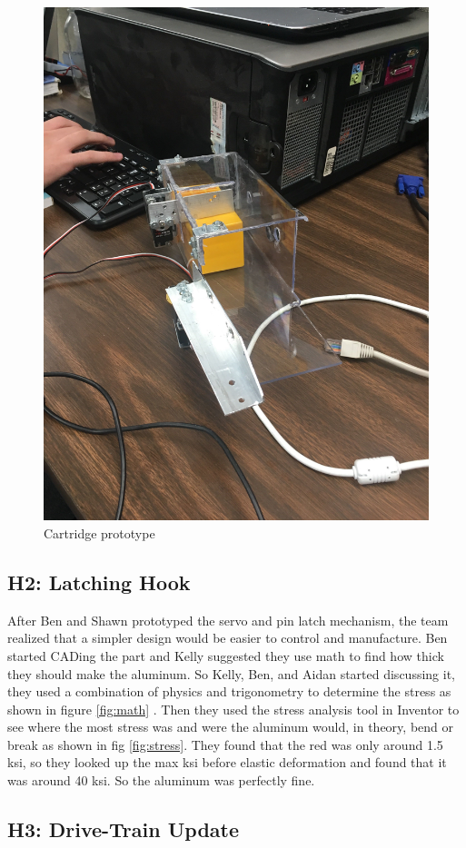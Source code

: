 \documentclass{article}
\begin{document}
\begin{figure}
    \centering
    \includegraphics[width=.6 \textwidth]{14_12-03/images/cartridge3.JPG}
    \caption{Cartridge prototype}
    \label{fig:thing}
\end{figure}

\subsection{H2: Latching Hook}

After Ben and Shawn prototyped the servo and pin latch mechanism, the team realized that a simpler design would be easier to control and manufacture. Ben started CADing the part and Kelly suggested they use math to find how thick they should make the aluminum. So Kelly, Ben, and Aidan started discussing it, they used a combination of physics and trigonometry to determine the stress as shown in figure \ref{fig:math} . Then they used the stress analysis tool in Inventor to see where the most stress was and were the aluminum would, in theory, bend or break as shown in fig \ref{fig:stress}. They found that the red was only around 1.5 ksi, so they looked up the max ksi before elastic deformation and found that it was around 40 ksi. So the aluminum was perfectly fine.


\subsection{H3: Drive-Train Update}
\end{document}
